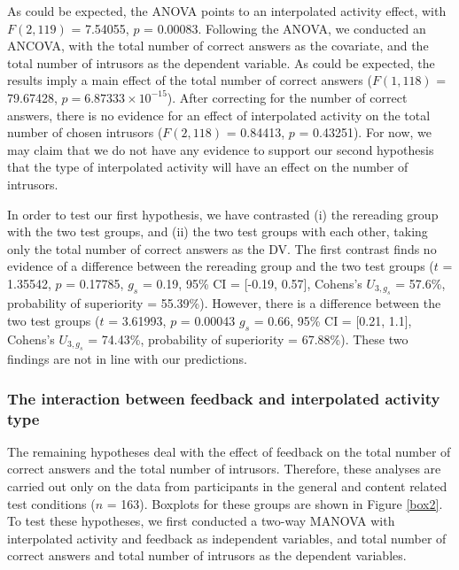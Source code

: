\documentclass[11pt,]{article}
\begin{document}
As could be expected, the ANOVA points to an interpolated activity
effect, with \(F(2, 119)\) = 7.54055, \(p\) = 0.00083. Following the
ANOVA, we conducted an ANCOVA, with the total number of correct answers
as the covariate, and the total number of intrusors as the dependent
variable. As could be expected, the results imply a main effect of the
total number of correct answers (\(F(1, 118)\) = 79.67428,
\(p = 6.87333\times 10^{-15}\)). After correcting for the number of
correct answers, there is no evidence for an effect of interpolated
activity on the total number of chosen intrusors (\(F (2, 118)\) =
0.84413, \(p\) = 0.43251). For now, we may claim that we do not have any
evidence to support our second hypothesis that the type of interpolated
activity will have an effect on the number of intrusors.

In order to test our first hypothesis, we have contrasted (i) the
rereading group with the two test groups, and (ii) the two test groups
with each other, taking only the total number of correct answers as the
DV. The first contrast finds no evidence of a difference between the
rereading group and the two test groups (\(t\) = 1.35542, \(p\) =
0.17785, \(g_s\) = 0.19, 95\% CI = {[}-0.19, 0.57{]}, Cohens's
\(U_{3, g_s}\) = 57.6\%, probability of superiority = 55.39\%). However,
there is a difference between the two test groups (\(t\) = 3.61993,
\(p\) = 0.00043 \(g_s\) = 0.66, 95\% CI = {[}0.21, 1.1{]}, Cohens's
\(U_{3, g_s}\) = 74.43\%, probability of superiority = 67.88\%). These
two findings are not in line with our predictions.

\hypertarget{the-interaction-between-feedback-and-interpolated-activity-type}{%
\subsubsection{The interaction between feedback and interpolated
activity
type}\label{the-interaction-between-feedback-and-interpolated-activity-type}}

The remaining hypotheses deal with the effect of feedback on the total
number of correct answers and the total number of intrusors. Therefore,
these analyses are carried out only on the data from participants in the
general and content related test conditions (\(n\) = 163). Boxplots for
these groups are shown in Figure \ref{box2}. To test these hypotheses,
we first conducted a two-way MANOVA with interpolated activity and
feedback as independent variables, and total number of correct answers
and total number of intrusors as the dependent variables.
\end{document}
